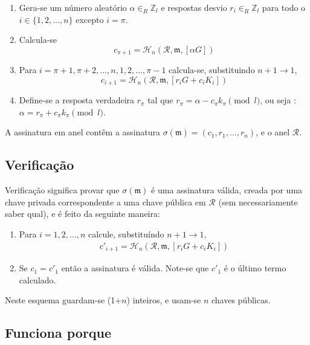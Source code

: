 \begin{enumerate}
	\item Gera-se um número aleatório \(\alpha \in_R \mathbb{Z}_l\) e respostas desvio  \(r_i \in_R \mathbb{Z}_l\) para todo o \(i \in \{1, 2, ..., n\}\) excepto \(i = \pi\).

	\item Calcula-se 
	\[c_{\pi+1} = \mathcal{H}_n(\mathcal{R}, \mathfrak{m}, [\alpha G])\]

	\item Para \(i = \pi+1, \pi+2, ..., n, 1, 2, ..., \pi-1\) calcula-se, substituindo \(n + 1 \rightarrow 1\),\vspace{.175cm}
	\[  c_{i+1} = \mathcal{H}_n(\mathcal{R}, \mathfrak{m}, [r_i G + c_i K_i])\] 

	\item Define-se a resposta verdadeira $r_\pi$ tal que \(r_\pi = \alpha - c_\pi k_\pi \pmod l\), ou seja :
\(\alpha = r_\pi + c_\pi k_\pi \pmod l\).
\end{enumerate}

A assinatura em anel contêm a assinatura \(\sigma(\mathfrak{m}) = (c_1, r_1, ..., r_n) \), e o anel $\mathcal{R}$.


\subsection*{Verificação}

Verificação significa provar que $\sigma(\mathfrak{m})$ é uma assinatura válida, creada por uma chave privada correspondente a uma chave pública em $\mathcal{R}$ (sem necessariamente saber qual), e é feito da seguinte maneira:

\begin{enumerate}
	\item Para \(i = 1, 2, ..., n\) calcule, substituíndo \(n + 1 \rightarrow 1\),\vspace{.175cm}
	\begin{align*}
	c'_{i+1}   = \mathcal{H}_n(\mathcal{R}, \mathfrak{m}, [r_i G + c_i {K_i}])
	\end{align*}

	\item Se \(c_1 = c'_1\) então a assinatura é válida. Note-se que $c'_1$ é o último termo calculado.
\end{enumerate}

Neste esquema guardam-se (1+$n$) inteiros, e usam-se $n$ chaves públicas.


\subsection*{Funciona porque}

